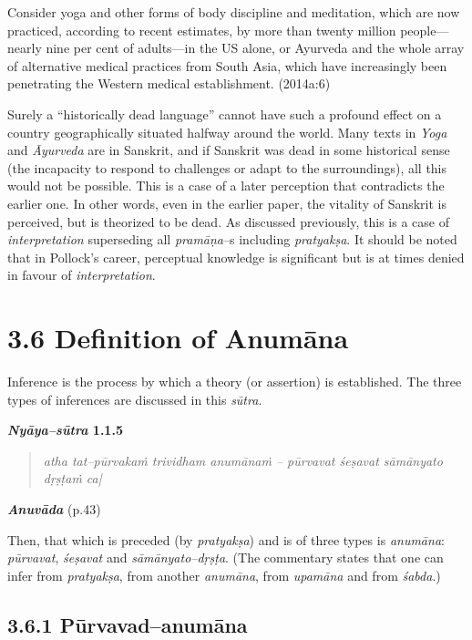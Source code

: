 \begin{myquote}
Consider yoga and other forms of body discipline and meditation, which are now practiced, according to recent estimates, by more than twenty million people—nearly nine per cent of adults—in the US alone, or Ayurveda and the whole array of alternative medical practices from South Asia, which have increasingly been penetrating the Western medical establishment. (2014a:6)
\end{myquote}

Surely a “historically dead language” cannot have such a profound effect on a country geographically situated halfway around the world. Many texts in \textit{Yoga} and \textit{Āyurveda} are in Sanskrit, and if Sanskrit was dead in some historical sense (the incapacity to respond to challenges or adapt to the surroundings), all this would not be possible. This is a case of a later perception that contradicts the earlier one. In other words, even in the earlier paper, the vitality of Sanskrit is perceived, but is theorized to be dead. As discussed previously, this is a case of \textit{interpretation} superseding all \textit{pramāṇa}–s including\textit{ pratyakṣa}. It should be noted that in Pollock’s career, perceptual knowledge is significant but is at times denied in favour of \textit{interpretation}.


\section*{3.6 Definition of Anumāna}

Inference is the process by which a theory (or assertion) is established. The three types of inferences are discussed in this \textit{sūtra}.

\textbf{\textit{Nyāya–sūtra} 1.1.5}

\begin{verse}
\textit{atha tat–pūrvakaṁ trividham anumānaṁ – pūrvavat śeṣavat sāmānyato dṛṣṭaṁ ca|}
\end{verse}

\textit{\textbf{Anuvāda}} (p.43)

Then, that which is preceded (by \textit{pratyakṣa}) and is of three types is\textit{ anumāna}: \textit{pūrvavat}, \textit{śeṣavat} and \textit{sāmānyato–dṛṣṭa}. (The commentary states that one can infer from \textit{pratyakṣa}, from another \textit{anumāna}, from \textit{upamāna} and from \textit{śabda}.)

\subsection*{3.6.1 Pūrvavad–anumāna}

